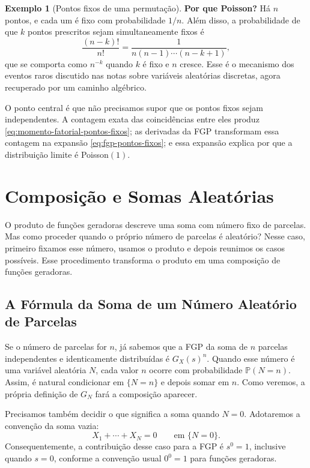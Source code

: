 \documentclass[12pt,portuguese]{article}
\theoremstyle{definition}
\newtheorem{example}[example]{Exemplo}
\theoremstyle{plainexercise}
\theoremstyle{starredexercise}
\theoremstyle{definition}
\begin{document}
\begin{example}[Pontos fixos de uma permutação]
\medskip
\noindent\textbf{Por que Poisson?}
Há $n$ pontos, e cada um é fixo com probabilidade $1/n$. Além disso, a
probabilidade de que $k$ pontos prescritos sejam simultaneamente fixos é
\[
\frac{(n-k)!}{n!}
=\frac{1}{n(n-1)\cdots(n-k+1)},
\]
que se comporta como $n^{-k}$ quando $k$ é fixo e $n$ cresce. Esse é o
mecanismo dos eventos raros discutido nas notas sobre variáveis aleatórias
discretas, agora recuperado por um caminho algébrico.

O ponto central é que não precisamos supor que os pontos fixos sejam
independentes. A contagem exata das coincidências entre eles produz
\eqref{eq:momento-fatorial-pontos-fixos}; as derivadas da FGP transformam essa
contagem na expansão \eqref{eq:fgp-pontos-fixos}; e essa expansão explica por
que a distribuição limite é Poisson$(1)$.
\end{example}

\section{Composição e Somas Aleatórias}
\label{sec:somas-aleatorias-fgp}

O produto de funções geradoras descreve uma soma com número fixo de
parcelas. Mas como proceder quando o próprio número de parcelas é aleatório?
Nesse caso, primeiro fixamos esse número, usamos o produto e depois reunimos
os casos possíveis. Esse procedimento transforma o produto em uma composição
de funções geradoras.

\subsection{A Fórmula da Soma de um Número Aleatório de Parcelas}
\label{sec:formula-soma-aleatoria}

Se o número de parcelas for $n$, já sabemos que a FGP da soma de $n$
parcelas independentes e identicamente distribuídas é $G_X(s)^n$.
Quando esse número é uma variável aleatória $N$, cada valor $n$ ocorre com
probabilidade $\mathbb{P}(N=n)$. Assim, é natural condicionar em
$\{N=n\}$ e depois somar em $n$. Como veremos, a própria definição de
$G_N$ fará a composição aparecer.

Precisamos também decidir o que significa a soma quando $N=0$. Adotaremos a
convenção da soma vazia:
\[
X_1+\cdots+X_N=0
\qquad\text{em }\{N=0\}.
\]
Consequentemente, a contribuição desse caso para a FGP é $s^0=1$, inclusive
quando $s=0$, conforme a convenção usual $0^0=1$ para funções geradoras.
\end{document}

